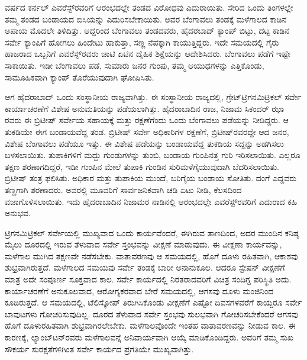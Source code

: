 \newpage

 ವರ್ಷದ ಕರ್ನಲ್​ ಎವರೆಸ್ಟ್​ರವರಿಗೆ ಆರಂಭದಲ್ಲೇ ತಂಡದ ವಿರೋಧವು ಎದು\break ರಾಯಿತು. ಸೇರಿದ ಒಂದು ತಿಂಗಳಲ್ಲೇ ತಮ್ಮ ತಂಡದ ಬಂಡಾಯದ ಬಿಸಿಯನ್ನು ಎದುರಿಸಬೇಕಾಯಿತು. ಅವರ ಬೆಂಗಾವಲು ತಂಡಕ್ಕೆ ಮಳೆಗಾಲದ ಕಾಡಿನ ಅಪಾಯ ಮೊದಲೇ ತಿಳಿದಿತ್ತು. ಆದ್ದರಿಂದ ಬೆಂಗಾವಲು ತಂಡದವರು, ಹೈದರಬಾದ್​ ಕ್ಯಾಂಪ್​ ಬಿಟ್ಟು, ದಟ್ಟ ಕಾಡಿನ ಸರ್ವೇ ಕ್ಯಾಂಪಿಗೆ ಹೋಗಲು ಹಿಂದೇಟು ಹಾಕುತ್ತಾ, ಸಣ್ಣ ನೆಪಕ್ಕಾಗಿ ಕಾಯುತ್ತಿದ್ದರು. ಇದೇ ಸಮಯದಲ್ಲಿ ಗೈರು ಹಾಜರಾದ ಒಬ್ಬನಿಗೆ ಎವರೆಸ್ಟ್​ರವರು ಚಾಟಿ ಏಟಿನ ದೈಹಿಕ ಶಿಕ್ಷೆಯನ್ನು ಆದೇಶಿಸಿದರು. ಬೆಂಗಾವಲು ಪಡೆಗೆ ಇಷ್ಟೇ ಸಾಕಾಯಿತು. ಇಡೀ ಬೆಂಗಾವಲು ಪಡೆ, ಸುಮಾರು  ಜನರ ಗುಂಪು, ತಮ್ಮ ಆಯುಧಗಳನ್ನು ಎತ್ತಿಕೊಂಡು, ಸಾಮೂಹಿಕವಾಗಿ ಕ್ಯಾಂಪ್​ ತೊರೆಯುವುದಾಗಿ ಘೋಷಿಸಿತು.

ಆಗ ಹೈದರಾಬಾದ್​ ಒಂದು ಸಂಸ್ಥಾನೀಯ ರಾಜ್ಯವಾಗಿತ್ತು. ಈ ಸಂಸ್ಥಾನೀಯ ರಾಜ್ಯದಲ್ಲಿ, ಗ್ರೇಟ್​ ಟ್ರಿಗನಮಿಟ್ರಿಕಲ್​ ಸರ್ವೇ ಕಾರ್ಯಾಚರಣೆಗೆ ವಿಶೇಷ ಅನುಮತಿಯನ್ನು ಪಡೆಯಲಾಗಿತ್ತು. ಹೈದರಾಬಾದಿನ ರಾಜ, ನಿಜಾಮ ಸಿಕಂದರ್​ ಝಾ ರವರು ಈ ಬ್ರಿಟೀಷ್​ ಸರ್ವೇಯ ಸಹಾಯಕ್ಕೆ ಮತ್ತು ರಕ್ಷಣೆಗೆಂದು ಒಂದು ಬೆಂಗಾವಲು ಪಡೆಯನ್ನು ನೀಡಿದ್ದರು. ಆ ತುಕಡಿಯೇ ಈಗ ಬಂಡಾಯವೆದ್ದ ತಂಡ. ಬ್ರಿಟೀಷ್​ ಸರ್ವೇ ಅಧಿಕಾರಿಗಳ ರಕ್ಷಣೆಗೆ, ಬ್ರಿಟೀಷ್​ರವರದ್ದೇ ಆದ  ಜನರ, ವಿಶೇಷ ಬೆಂಗಾವಲು ಪಡೆಯೂ ಇತ್ತು. ಈ ವಿಶೇಷ ಪಡೆಯನ್ನು ಬಂಡಾಯವೆದ್ದ ತುಕಡಿಯ ಸದ್ದನ್ನು ಅಡಗಿಸಲು ಬಳಸಲಾಯಿತು. ತುಪಾಕಿಗಳಿಗೆ ಮದ್ದು ಗುಂಡುಗಳನ್ನು ತುಂಬಿ, ಬಂಡಾಯ ಗುಂಪಿನತ್ತ ಗುರಿ ಇರಿಸಲಾಯಿತು. ಎಲ್ಲರೂ ತಕ್ಷಣ ಶರಣಾಗದಿದ್ದರೆ, ಇಡೀ ಗುಂಪಿನ ಮೇಲೆ ತುಪಾಕಿ ಗುಂಡಿನ ಸುರಿಮಳೆಗೈಯುವುದಾಗಿ ಬೆದರಿಸಲಾಯಿತು. ಬ್ರಿಟೀಷ್​ ತಂತ್ರ ಫಲಿಸಿತು. ಅಧಿಕಾರ ಮತ್ತು ತುಪಾಕಿಯ ಮುಂದೆ, ಬರಿಗೈಯ ಬಂಡಾಯ ಸೋತಿತು. ದಂಗೆ ಎದ್ದವರು ತಣ್ಣಗಾಗಿ ಶರಣಾದರು. ಅವರಲ್ಲಿ ಮೂವರಿಗೆ ಸಾರ್ವಜನಿಕವಾಗಿ ಚಡಿ ಏಟು ನೀಡಿ, ಕೆಲಸದಿಂದ ವಜಾಗೊಳಿಸಲಾಯಿತು. ಇದು ಹೈದರಾಬಾದಿನ ನಿಜಾಮರ ನಾಡಿನಲ್ಲಿ ಆರಂಭದಲ್ಲೇ ಎವರೆಸ್ಟ್​ರವರಿಗೆ ಎದುರಾದ ಕಹಿ ಅನುಭವ.

ಟ್ರಿಗನಮಿಟ್ರಿಕಲ್​ ಸರ್ವೇಯಲ್ಲಿ ಮುಖ್ಯವಾದ ಒಂದು ಕಾರ್ಯವೆಂದರೆ, ಈಗಿರುವ ತಾಣದಿಂದ, ಅದರ ಮುಂದಿನ ಕನಿಷ್ಠ  ಮೈಲು ದೂರದಲ್ಲಿ ಇರುವ ತೆಳುವಾದ ಸರ್ವೇ ಸ್ತಂಭವನ್ನು ವೀಕ್ಷಣೆ ಮಾಡುವುದು. ಈ ವೀಕ್ಷಣಾ ಕಾರ್ಯವನ್ನು, ಮಳೆಗಾಲ ಮುಗಿದ ತಕ್ಷಣವೇ ನಡೆಸಬೇಕು. ವಾತಾವರಣವು ಆ ಸಮಯದಲ್ಲಿ, ಹೊಗೆ ದೂಳು ರಹಿತವಾಗಿ, ಆಕಾಶವು ಶುಭ್ರವಾಗಿರುತ್ತದೆ. ಮಳೆಗಾಲದ ಸಮಯವು ಸರ್ವೇ ತಂಡಕ್ಕೆ ಬಾರೀ ಅನಾನುಕೂಲ. ಆದರೂ ಸ್ಟೇಷನ್​ ವೀಕ್ಷಣೆಗೆ ಮಾತ್ರ ಅದೇ ಸಂಪೂರ್ಣ ಸೂಕ್ತವಾದ ಕಾಲ. ಸರ್ವೇ ಕಾರ್ಯದಲ್ಲಿ ನಿರತರಾದವರಿಗೆ ವಿಚಿತ್ರ ಸಂದಿಗ್ದ ಪರಿಸ್ಥಿತಿ ಅದು. ಕಾರ್ಯಾಚರಣೆಗೆ ಅನುಕೂಲವಾದ, ಆರೋಗ್ಯಕರವಾದ ಬೇರೆ ಸಮಯದಲ್ಲಿ, ಆಗಸವು ದೂಳು ಮಂಜಿನಿಂದ ಕೂಡಿರುತ್ತದೆ. ಆ ಸಮಯದಲ್ಲಿ, ಟೆಲಿಸ್ಕೋಪ್​ ತಿರುಗಿಸಿಕೊಂಡು ವೀಕ್ಷಣೆಗೆ ಎಷ್ಟೋ ದಿವಸಗಳವರೆಗೆ ಕಾಯ್ದರೂ ಸರ್ವೇ ಬಾವುಟಗಳು ಗೋಚರಿಸುವುದಿಲ್ಲ. ದೂರದ ತೆಳುವಾದ ಸರ್ವೇ ಸ್ತಂಭವು ಸುಲಭವಾಗಿ ಗೋಚರಿಸಬೇಕೆಂದರೆ ಆಗಸವು ಹೊಗೆ ದೂಳುರಹಿತವಾಗಿ ಶುಭ್ರವಾಗಿರಲೇಬೇಕು. ಮಳೆಗಾಲವೊಂದೇ ಇಂತಹ ವಾತಾವರಣವನ್ನು ನೀಡುವ ಕಾಲ. ಈ ಕಾರಣಕ್ಕೆ, ಲ್ಯಾಂಬ್​ಟನ್​ರವರು ಮಳೆಗಾಲವನ್ನೆ ಅನಿವಾರ್ಯವಾಗಿ ಆಯ್ಕೆ ಮಾಡಿಕೊಂಡಿದ್ದರು. ಅವರಿಗೆ ತಮ್ಮ ಸುಖ ಸೌಕರ್ಯ ಸುರಕ್ಷತೆಗಳಿಗಿಂತ ಸರ್ವೇ ಕಾರ್ಯದ ಪ್ರಗತಿಯೇ ಮುಖ್ಯವಾಗಿತ್ತು.

